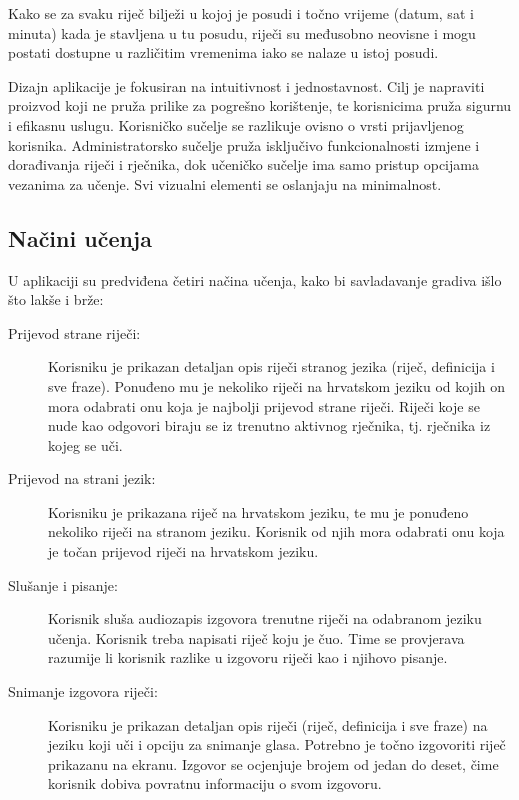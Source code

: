 Kako se za svaku riječ bilježi u kojoj je posudi i točno vrijeme (datum, sat i minuta) kada je stavljena u tu posudu, riječi su međusobno neovisne i mogu postati dostupne u različitim vremenima iako se nalaze u istoj posudi. 

Dizajn aplikacije je fokusiran na intuitivnost i jednostavnost. Cilj je napraviti proizvod koji ne pruža prilike
za pogrešno korištenje, te korisnicima pruža sigurnu i efikasnu uslugu. Korisničko sučelje se razlikuje
ovisno o vrsti prijavljenog korisnika. Administratorsko sučelje pruža isključivo funkcionalnosti izmjene i dorađivanja
riječi i rječnika, dok učeničko sučelje ima samo pristup opcijama vezanima za učenje. Svi vizualni elementi se
oslanjaju na minimalnost.

\subsection{Načini učenja} 

U aplikaciji su predviđena četiri načina učenja, kako bi savladavanje gradiva išlo što lakše i brže:
\begin{description}
	\item[Prijevod strane riječi:] Korisniku je prikazan detaljan opis riječi stranog jezika (riječ, definicija i sve fraze). Ponuđeno mu je nekoliko riječi na hrvatskom jeziku od kojih on mora odabrati onu koja je najbolji prijevod strane riječi. Riječi koje se nude kao odgovori biraju se iz trenutno aktivnog rječnika, tj. rječnika iz kojeg se uči. 

	\item[Prijevod na strani jezik:] Korisniku je prikazana riječ na hrvatskom jeziku, te mu je ponuđeno nekoliko riječi na stranom jeziku. Korisnik od njih mora odabrati onu koja je točan prijevod riječi na hrvatskom jeziku.

	\item[Slušanje i pisanje:] Korisnik sluša audiozapis izgovora trenutne riječi na odabranom jeziku učenja. Korisnik treba napisati riječ koju je čuo. Time se provjerava razumije li korisnik razlike u izgovoru riječi kao i njihovo pisanje.

	\item[Snimanje izgovora riječi:] Korisniku je prikazan detaljan opis riječi (riječ, definicija i sve fraze) na jeziku koji uči i opciju za snimanje glasa. Potrebno je točno izgovoriti riječ prikazanu na ekranu. Izgovor se ocjenjuje brojem od jedan do deset, čime korisnik dobiva povratnu informaciju o svom izgovoru.
\end{description}

